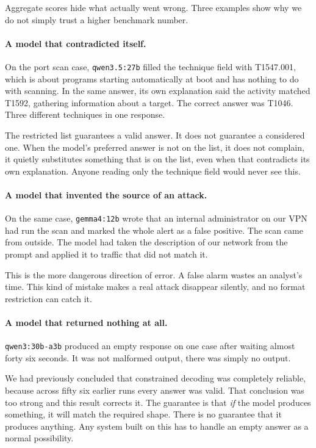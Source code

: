 \documentclass[11pt,a4paper]{article}
\begin{document}
Aggregate scores hide what actually went wrong. Three examples show why we do not
simply trust a higher benchmark number.

\paragraph{A model that contradicted itself.}
On the port scan case, \texttt{qwen3.5:27b} filled the technique field with T1547.001,
which is about programs starting automatically at boot and has nothing to do with
scanning. In the same answer, its own explanation said the activity matched T1592,
gathering information about a target. The correct answer was T1046. Three different
techniques in one response.

The restricted list guarantees a valid answer. It does not guarantee a considered
one. When the model's preferred answer is not on the list, it does not complain, it
quietly substitutes something that is on the list, even when that contradicts its own
explanation. Anyone reading only the technique field would never see this.

\paragraph{A model that invented the source of an attack.}
On the same case, \texttt{gemma4:12b} wrote that an internal administrator on our VPN
had run the scan and marked the whole alert as a false positive. The scan came from
outside. The model had taken the description of our network from the prompt and
applied it to traffic that did not match it.

This is the more dangerous direction of error. A false alarm wastes an analyst's
time. This kind of mistake makes a real attack disappear silently, and no format
restriction can catch it.

\paragraph{A model that returned nothing at all.}
\texttt{qwen3:30b-a3b} produced an empty response on one case after waiting almost
forty six seconds. It was not malformed output, there was simply no output.

We had previously concluded that constrained decoding was completely reliable,
because across fifty six earlier runs every answer was valid. That conclusion was
too strong and this result corrects it. The guarantee is that \emph{if} the model
produces something, it will match the required shape. There is no guarantee that it
produces anything. Any system built on this has to handle an empty answer as a normal
possibility.
\end{document}
